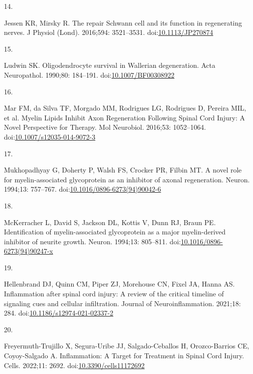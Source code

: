 \documentclass[
  12pt,
  a4paper,
]{book}
\newlength{\cslhangindent}
\newlength{\csllabelwidth}
\newlength{\cslentryspacingunit} %
\newenvironment{CSLReferences}[2] %
 {%
  \setlength{\parindent}{0pt}
  \ifodd #1
  \let\oldpar\par
  \def\par{\hangindent=\cslhangindent\oldpar}
  \fi
  \setlength{\parskip}{#2\cslentryspacingunit}
 }%
 {}
\newcommand{\CSLLeftMargin}[1]{\parbox[t]{\csllabelwidth}{#1}}
\newcommand{\CSLRightInline}[1]{\parbox[t]{\linewidth - \csllabelwidth}{#1}\break}
\begin{document}
\begin{CSLReferences}{0}{0}
\leavevmode{}%
\CSLLeftMargin{14. }%
\CSLRightInline{Jessen KR, Mirsky R. The repair {Schwann} cell and its function in regenerating nerves. J Physiol (Lond). 2016;594: 3521--3531. doi:\href{https://doi.org/10.1113/JP270874}{10.1113/JP270874}}

\leavevmode{}%
\CSLLeftMargin{15. }%
\CSLRightInline{Ludwin SK. Oligodendrocyte survival in {Wallerian} degeneration. Acta Neuropathol. 1990;80: 184--191. doi:\href{https://doi.org/10.1007/BF00308922}{10.1007/BF00308922}}

\leavevmode{}%
\CSLLeftMargin{16. }%
\CSLRightInline{Mar FM, da Silva TF, Morgado MM, Rodrigues LG, Rodrigues D, Pereira MIL, et al. Myelin {Lipids Inhibit Axon Regeneration Following Spinal Cord Injury}: A {Novel Perspective} for {Therapy}. Mol Neurobiol. 2016;53: 1052--1064. doi:\href{https://doi.org/10.1007/s12035-014-9072-3}{10.1007/s12035-014-9072-3}}

\leavevmode{}%
\CSLLeftMargin{17. }%
\CSLRightInline{Mukhopadhyay G, Doherty P, Walsh FS, Crocker PR, Filbin MT. A novel role for myelin-associated glycoprotein as an inhibitor of axonal regeneration. Neuron. 1994;13: 757--767. doi:\href{https://doi.org/10.1016/0896-6273(94)90042-6}{10.1016/0896-6273(94)90042-6}}

\leavevmode{}%
\CSLLeftMargin{18. }%
\CSLRightInline{McKerracher L, David S, Jackson DL, Kottis V, Dunn RJ, Braun PE. Identification of myelin-associated glycoprotein as a major myelin-derived inhibitor of neurite growth. Neuron. 1994;13: 805--811. doi:\href{https://doi.org/10.1016/0896-6273(94)90247-x}{10.1016/0896-6273(94)90247-x}}

\leavevmode{}%
\CSLLeftMargin{19. }%
\CSLRightInline{Hellenbrand DJ, Quinn CM, Piper ZJ, Morehouse CN, Fixel JA, Hanna AS. Inflammation after spinal cord injury: A review of the critical timeline of signaling cues and cellular infiltration. Journal of Neuroinflammation. 2021;18: 284. doi:\href{https://doi.org/10.1186/s12974-021-02337-2}{10.1186/s12974-021-02337-2}}

\leavevmode{}%
\CSLLeftMargin{20. }%
\CSLRightInline{Freyermuth-Trujillo X, Segura-Uribe JJ, Salgado-Ceballos H, Orozco-Barrios CE, Coyoy-Salgado A. Inflammation: {A Target} for {Treatment} in {Spinal Cord Injury}. Cells. 2022;11: 2692. doi:\href{https://doi.org/10.3390/cells11172692}{10.3390/cells11172692}}


\end{CSLReferences}
\end{document}
